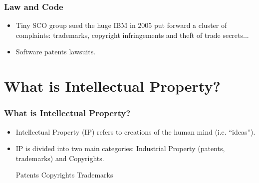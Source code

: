 \documentclass{beamer}
\begin{document}


\begin{frame}
\frametitle{Law and Code}

\begin{itemize}
\item Tiny SCO group sued the huge IBM in 2005 put forward a cluster of complaints: trademarks, copyright infringements and theft of trade secrets...
\item Software patents lawsuits. 
\end{itemize}

\end{frame}





\section{What is Intellectual Property?}
\begin{frame}
\frametitle{What is Intellectual Property?}

\begin{itemize}
\item Intellectual Property (IP) refers to creations of the human mind (i.e. ``ideas'').
\item IP is divided into two main categories: \alert{Industrial Property} (patents, trademarks) and \alert{Copyrights}.  

\vspace{1cm}

\begin{center}
{\large \alert{Patents}} \hspace{1.2cm}	{\LARGE \alert{Copyrights}} \hspace{1.2cm} 
{\large \alert{Trademarks}}
\end{center}

\end{itemize}

\end{frame}

\end{document}
